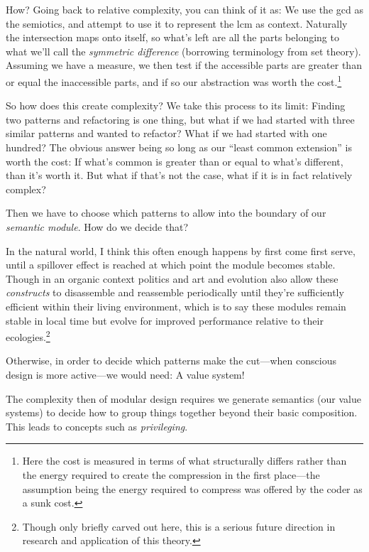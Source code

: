 \documentclass[twoside]{article}
\begin{document}

How? Going back to relative complexity, you can think of it as: We use the gcd as the semiotics, and attempt to use
it to represent the lcm as context. Naturally the intersection maps onto itself, so what's left are all the parts
belonging to what we'll call the \emph{symmetric difference} (borrowing terminology from set theory). 
Assuming we have a measure, we then test if the accessible parts are greater than or equal the inaccessible parts,
and if so our abstraction was worth the cost.\footnote{Here the cost is measured in terms of what structurally differs
rather than the energy required to create the compression in the first place---the assumption being the energy
required to compress was offered by the coder as a sunk cost.}

So how does this create complexity? We take this process to its limit: Finding two patterns and refactoring is one
thing, but what if we had started with three similar patterns and wanted to refactor? What if we had started with
one hundred?  The obvious answer being so long as our ``least common extension'' is worth the cost: If what's
common is greater than or equal to what's different, than it's worth it. But what if that's not the case,
what if it is in fact relatively complex?

Then we have to choose which patterns to allow into the boundary of our \emph{semantic module}. How do we decide that?

In the natural world, I think this often enough happens by first come first serve, until a spillover effect is reached
at which point the module becomes stable. Though in an organic context politics and art and evolution also
allow these \emph{constructs} to disassemble and reassemble periodically until they're sufficiently efficient within
their living environment, which is to say these modules remain stable in local time but evolve for improved performance relative
to their ecologies.\footnote{Though only briefly carved out here, this is a serious future direction in research and application
of this theory.}

Otherwise, in order to decide which patterns make the cut---when conscious design is more active---we would need: A value system!

The complexity then of modular design requires we generate semantics (our value systems) to decide how to group things
together beyond their basic composition. This leads to concepts such as \emph{privileging}.
\end{document}
